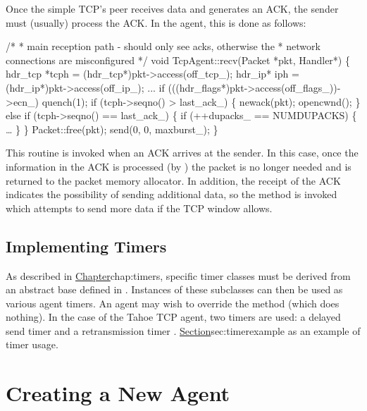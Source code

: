 Once the simple TCP's peer receives data and generates an ACK, the
sender must (usually) process the ACK.
In the  agent, this is done as follows:
\begin{program}
        /*
         * {\cf main reception path - should only see acks, otherwise the}
         * {\cf network connections are misconfigured}
         */
        void TcpAgent::recv(Packet *pkt, Handler*)
        \{
                hdr_tcp *tcph = (hdr_tcp*)pkt->access(off_tcp_);
                hdr_ip* iph = (hdr_ip*)pkt->access(off_ip_);
                ...
                if (((hdr_flags*)pkt->access(off_flags_))->ecn_)
                        quench(1);
                if (tcph->seqno() > last_ack_) \{
                        newack(pkt);
                        opencwnd();
                \} else if (tcph->seqno() == last_ack_) \{
                        if (++dupacks_ == NUMDUPACKS) \{
                                \ldots
                        \}
                \}
                Packet::free(pkt);
                send(0, 0, maxburst_);
       \}
\end{program}
This routine is invoked when an ACK arrives at the sender.
In this case, once the information in the ACK is processed (by )
the packet is no longer needed and is returned to the packet memory
allocator.
In addition, the receipt of the ACK indicates the possibility of sending
additional data, so the  method is
invoked which attempts to send more data if the TCP window allows.

\subsection{Implementing Timers}
\label{sec:tcptimer}

As described in 
\href{the following chapter}{Chapter}{chap:timers}, specific
timer classes must be derived from an abstract base
defined in .  Instances of these
subclasses can then be used as various agent timers.
An agent may wish to override the  method
(which does nothing).
In the case of the Tahoe TCP agent, two timers are used:
a delayed send timer  
and a retransmission timer .
\href{We describe the retransmission timer in TCP}{Section}{sec:timerexample}
as an example of timer usage.  

\section{Creating a New Agent}
\label{sec:createagent}

